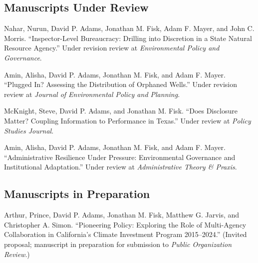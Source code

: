 \documentclass[12pt,letterpaper]{article}
\renewenvironment{itemize}{
  \begin{list}{}{
    \setlength{\leftmargin}{1.5em}
    \setlength{\itemsep}{0.25em}
    \setlength{\parskip}{0pt}
    \setlength{\parsep}{0.25em}
  }
}{
  \end{list}
}
\begin{document}
\subsection*{Manuscripts Under Review}
\begin{itemize}\leftmargin=2pt\itemindent=-15pt\leftmargin=2pt\itemindent=-15pt
  
  \item Nahar, Nurun, David P. Adams, Jonathan M. Fisk, Adam F. Mayer, and John C. Morris. ``Inspector-Level Bureaucracy: Drilling into Discretion in a State Natural Resource Agency.'' Under revision review at \emph{Environmental Policy and Governance}.
  
  \item Amin, Alisha, David P. Adams, Jonathan M. Fisk, and Adam F. Mayer. ``Plugged In? Assessing the Distribution of Orphaned Wells.'' Under revision review at \emph{Journal of Environmental Policy and Planning}.
  
  \item McKnight, Steve, David P. Adams, and Jonathan M. Fisk. ``Does Disclosure Matter? Coupling Information to Performance in Texas.'' Under review at \emph{Policy Studies Journal}.

  \item Amin, Alisha, David P. Adams, Jonathan M. Fisk, and Adam F. Mayer. ``Administrative Resilience Under Pressure: Environmental Governance and Institutional Adaptation.'' Under review at \emph{Administrative Theory \& Praxis}.

\end{itemize}


\subsection*{Manuscripts in Preparation}
  \begin{itemize} \leftmargin=2pt\itemindent=-15pt
    \item Arthur, Prince, David P. Adams, Jonathan M. Fisk, Matthew G. Jarvis, and Christopher A. Simon. ``Pioneering Policy: Exploring the Role of Multi-Agency Collaboration in California's Climate Investment Program 2015--2024.'' (Invited proposal; manuscript in preparation for submission to \textit{Public Organization Review}.)
  \end{itemize}
\end{document}
